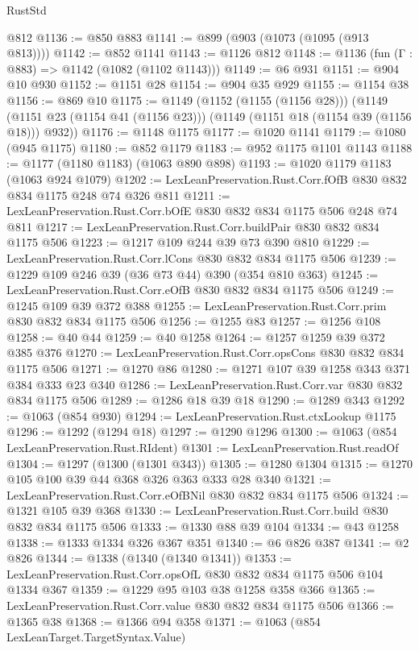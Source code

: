 \begin{lexlean}{RustStd}
\begin{coremodule}
{\begin{coremodule}
{{{{{    @812
@1136 := @850 @883
@1141 := @899 (@903 (@1073 (@1095 (@913 @813))))
@1142 := @852 @1141
@1143 := @1126 @812
@1148 := @1136 (fun (Γ : @883) => @1142 (@1082 (@1102 @1143)))
@1149 := @6 @931
@1151 := @904 @10 @930
@1152 := @1151 @28
@1154 := @904 @35 @929
@1155 := @1154 @38
@1156 := @869 @10
@1175 := @1149
    (@1152 (@1155 (@1156 @28)))
    (@1149 (@1151 @23 (@1154 @41 (@1156 @23))) (@1149 (@1151 @18 (@1154 @39 (@1156 @18))) @932))
@1176 := @1148 @1175
@1177 := @1020 @1141
@1179 := @1080 (@945 @1175)
@1180 := @852 @1179
@1183 := @952 @1175 @1101 @1143
@1188 := @1177 (@1180 @1183) (@1063 @890 @898)
@1193 := @1020 @1179 @1183 (@1063 @924 @1079)
@1202 := LexLeanPreservation.Rust.Corr.fOfB @830 @832 @834 @1175 @248 @74 @326 @811
@1211 := LexLeanPreservation.Rust.Corr.bOfE @830 @832 @834 @1175 @506 @248 @74 @811
@1217 := LexLeanPreservation.Rust.Corr.buildPair @830 @832 @834 @1175 @506
@1223 := @1217 @109 @244 @39 @73 @390 @810
@1229 := LexLeanPreservation.Rust.Corr.lCons @830 @832 @834 @1175 @506
@1239 := @1229 @109 @246 @39 (@36 @73 @44) @390 (@354 @810 @363)
@1245 := LexLeanPreservation.Rust.Corr.eOfB @830 @832 @834 @1175 @506
@1249 := @1245 @109 @39 @372 @388
@1255 := LexLeanPreservation.Rust.Corr.prim @830 @832 @834 @1175 @506
@1256 := @1255 @83
@1257 := @1256 @108
@1258 := @40 @44
@1259 := @40 @1258
@1264 := @1257 @1259 @39 @372 @385 @376
@1270 := LexLeanPreservation.Rust.Corr.opsCons @830 @832 @834 @1175 @506
@1271 := @1270 @86
@1280 := @1271 @107 @39 @1258 @343 @371 @384 @333 @23 @340
@1286 := LexLeanPreservation.Rust.Corr.var @830 @832 @834 @1175 @506
@1289 := @1286 @18 @39 @18
@1290 := @1289 @343
@1292 := @1063 (@854 @930)
@1294 := LexLeanPreservation.Rust.ctxLookup @1175
@1296 := @1292 (@1294 @18)
@1297 := @1290 @1296
@1300 := @1063 (@854 LexLeanPreservation.Rust.RIdent)
@1301 := LexLeanPreservation.Rust.readOf
@1304 := @1297 (@1300 (@1301 @343))
@1305 := @1280 @1304
@1315 := @1270 @105 @100 @39 @44 @368 @326 @363 @333 @28 @340
@1321 := LexLeanPreservation.Rust.Corr.eOfBNil @830 @832 @834 @1175 @506
@1324 := @1321 @105 @39 @368
@1330 := LexLeanPreservation.Rust.Corr.build @830 @832 @834 @1175 @506
@1333 := @1330 @88 @39 @104
@1334 := @43 @1258
@1338 := @1333 @1334 @326 @367 @351
@1340 := @6 @826 @387
@1341 := @2 @826
@1344 := @1338 (@1340 (@1340 @1341))
@1353 := LexLeanPreservation.Rust.Corr.opsOfL @830 @832 @834 @1175 @506 @104 @1334 @367
@1359 := @1229 @95 @103 @38 @1258 @358 @366
@1365 := LexLeanPreservation.Rust.Corr.value @830 @832 @834 @1175 @506
@1366 := @1365 @38
@1368 := @1366 @94 @358
@1371 := @1063 (@854 LexLeanTarget.TargetSyntax.Value)
}}}}}
\end{coremodule}}
\end{coremodule}
\end{lexlean}
